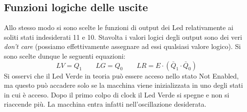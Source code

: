 \documentclass[10pt,a4paper]{article}
\begin{document}
\subsection{Funzioni logiche delle uscite}
Allo stesso modo si sono scelte le funzioni di output dei Led relativamente ai soliti stati indesiderati 11 e 10. Stavolta i valori logici degli output sono dei veri \emph{don't care} (possiamo effettivamente assegnare ad essi qualsiasi valore logico). Si sono scelte dunque le seguenti equazioni:
\begin{equation}
LV = Q_1\qquad LG = Q_0\qquad LR = E\cdot(\bar{Q}_1\cdot\bar{Q}_0)
\end{equation}
Si osservi che il Led Verde in teoria può essere acceso nello stato Not Enabled, ma questo può accadere solo se la macchina viene inizializzata in uno degli stati in cui è acceso. Dopo il primo colpo di clock il Led Verde si spegne e non si riaccende più. La macchina entra infatti nell'oscillazione desiderata.\\
\end{document}

